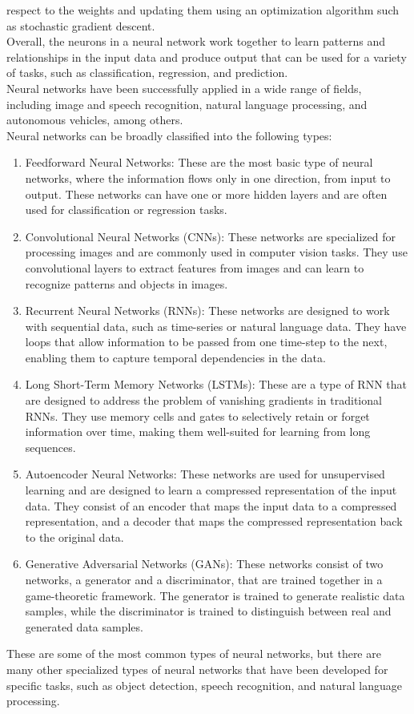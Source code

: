 respect to the weights and updating them using an optimization algorithm such as stochastic gradient descent.\\
Overall, the neurons in a neural network work together to learn patterns and relationships in the input data and produce
output that can be used for a variety of tasks, such as classification, regression, and prediction.\\
Neural networks have been successfully applied in a wide range of fields, including image and speech recognition, natural language processing, and autonomous
vehicles, among others.\\
Neural networks can be broadly classified into the following types:
\begin{enumerate}
    \item Feedforward Neural Networks: These are the most basic type of neural networks, where the information flows only in one direction,
    from input to output. These networks can have one or more hidden layers and are often used for classification or regression tasks.
    \item Convolutional Neural Networks (CNNs): These networks are specialized for processing images and are commonly used in computer vision tasks.
    They use convolutional layers to extract features from images and can learn to recognize patterns and objects in images.
    \item Recurrent Neural Networks (RNNs): These networks are designed to work with sequential data, such as time-series or natural language data.
    They have loops that allow information to be passed from one time-step to the next, enabling them to capture temporal dependencies in the data.
    \item Long Short-Term Memory Networks (LSTMs): These are a type of RNN that are designed to address the problem of vanishing gradients in traditional RNNs.
    They use memory cells and gates to selectively retain or forget information over time, making them well-suited for learning from long sequences.
    \item Autoencoder Neural Networks: These networks are used for unsupervised learning and are designed to learn a compressed
    representation of the input data. They consist of an encoder that maps the input data to a compressed representation, and a decoder
    that maps the compressed representation back to the original data.
    \item Generative Adversarial Networks (GANs): These networks consist of two networks, a generator and a discriminator,
    that are trained together in a game-theoretic framework. The generator is trained to generate realistic data samples, while the discriminator is
    trained to distinguish between real and generated data samples.
\end{enumerate}
These are some of the most common types of neural networks, but there are many other specialized types of neural networks that have been
developed for specific tasks, such as object detection, speech recognition, and natural language processing.\\
